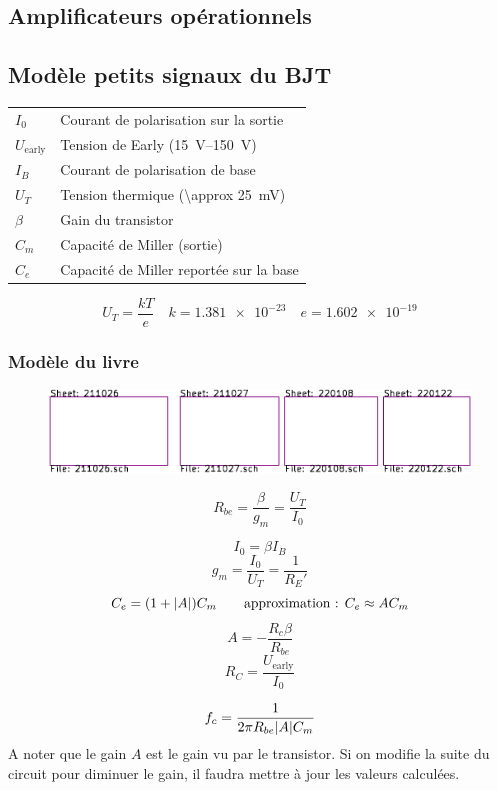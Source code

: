\documentclass[resume]{subfiles}
\begin{document}
\begin{multicols}{3}
\section{Amplificateurs opérationnels}

\subsection{Modèle petits signaux du BJT}
\begin{center}
\begin{tabular}{ll}
$I_0$ & Courant de polarisation sur la sortie\\
$U_{\text{early}}$ & Tension de Early (\SIrange{15}{150}{\volt})\\
$I_B$ & Courant de polarisation de base\\
$U_T$ & Tension thermique (\SI{\approx 25}{\milli\volt})\\
$\beta$ & Gain du transistor\\
$C_m$ & Capacité de Miller (sortie)\\
$C_e$ & Capacité de Miller reportée sur la base
\end{tabular}
\end{center}
$$U_T=\frac{kT}{e}\quad k=\num{1.381e-23}\quad e=\num{1.602e-19}$$
\columnbreak
\subsubsection{Modèle du livre}
\begin{figure}[H]
\centering
\includegraphics[scale=1,page=9]{../KiCad/resume-crop.pdf}
\end{figure}


$$R_{be}=\frac{\beta}{g_m}=\frac{U_T}{I_0}$$

$$I_0=\beta I_B$$
$$g_m=\frac{I_0}{U_T}=\frac{1}{R_E'}$$
$$C_e=(1+\abs{A})C_m\qquad \text{approximation : } C_e\approx AC_m$$
$$A=-\frac{R_c\beta}{R_{be}}$$
$$R_C=\frac{U_{\text{early}}}{I_0}$$


$$f_c=\frac{1}{2\pi R_{be} \abs{A} C_m}$$
A noter que le gain $A$ est le gain vu par le transistor. Si on modifie la suite du circuit pour diminuer le gain, il faudra mettre à jour les valeurs calculées.

\end{multicols}
\end{document}
